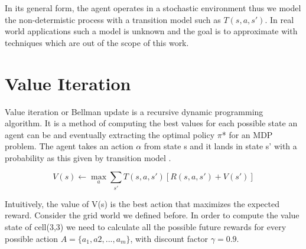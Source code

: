 \documentclass[10pt,a4paper,twocolumn]{article}
\begin{document}
	In its general form, the agent operates in a stochastic environment thus we model the non-determistic process with a transition model such as $T(s,a,s')$. In real world applications such a model is unknown and the goal is to approximate with techniques which are out of the scope of this work.
	
	\section{Value Iteration}
	Value iteration or Bellman update is a recursive dynamic programming algorithm. It is a method of computing the best values for each possible state an agent can be and eventually extracting the optimal policy $\pi$* for an MDP problem. The agent takes an action $\alpha$ from state s and it lands in state s’ with a probability as this given by transition model . 
	
	\begin{equation}
		V(s) \leftarrow \max_{a}{ \sum_{s'}T(s,a,s') [R(s,a,s') + V(s')]}
	\end{equation}
	
	Intuitively, the value of V(s) is the best action that maximizes the expected reward. Consider the grid world we defined before. In order to compute the value state of cell(3,3) we need to calculate all the possible future rewards for every possible action $A = \{ a_{1}, a{2}, ..., a_{m} \}$, with discount factor $\gamma = 0.9$.
	
\end{document}
